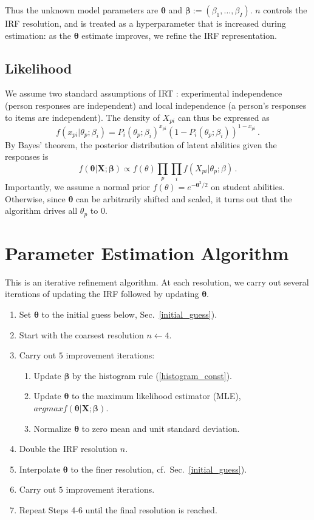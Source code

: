 \documentclass{article}
\newcommand{\bbeta}{\boldsymbol\beta}
\newcommand{\bta}{\boldsymbol\ta}
\newcommand{\ta}{\theta}
\newcommand{\bX}{\mathbf{X}}
\begin{document}
Thus the unknown model parameters are $\bta$ and $\bbeta := (\beta_1,\dots,\beta_I)$. $n$ controls the IRF resolution, and is treated as a hyperparameter that is increased during estimation: as the $\bta$ estimate improves, we refine the IRF representation.

\subsection{Likelihood}
We assume two standard assumptions of IRT \cite{junker}: experimental independence (person responses are independent) and local independence (a person's responses to items are independent). The density of $X_{pi}$ can thus be expressed as 
\begin{equation}
  f(x_{pi}|\ta_p;\beta_i) = P_i(\ta_p;\beta_i)^{x_{pi}} \left(1 - P_i(\ta_p;\beta_i)\right)^{1-x_{pi}}\,.
\end{equation}
By Bayes' theorem, the posterior distribution of latent abilities given the responses is
\begin{equation}
  f(\bta|\bX;\bbeta) \propto f(\theta)  \prod_p \prod_i f(X_{pi}|\ta_p;\beta)\,.
  \label{like}
\end{equation}
Importantly, we assume a normal prior $f(\theta) = e^{-\bta^2/2}$ on student abilities. Otherwise, since $\bta$ can be arbitrarily shifted and scaled, it turns out that the algorithm drives all $\theta_p$ to $0$.

\section{Parameter Estimation Algorithm}
This is an iterative refinement algorithm. At each resolution, we carry out several iterations of updating the IRF followed by updating $\bta$.
\begin{enumerate}
	\item Set $\bta$ to the initial guess below, Sec.~\ref{initial_guess}).
	\item Start with the coarsest resolution $n \longleftarrow 4$.
	\item Carry out $5$ improvement iterations:
	\begin{enumerate}
	    	\item Update $\bbeta$ by the histogram rule (\ref{histogram_const}).
	    	\item Update $\bta$ to the maximum likelihood estimator (MLE), $argmax f(\bta|\bX;\bbeta)$.
	    	\item Normalize $\bta$ to zero mean and unit standard deviation.
	\end{enumerate}
	\item Double the IRF resolution $n$. 
	\item Interpolate $\bta$ to the finer resolution, cf.~Sec.~\ref{initial_guess}).
	\item Carry out $5$ improvement iterations.
	\item Repeat Steps 4-6 until the final resolution is reached.
\end{enumerate}
\end{document}
